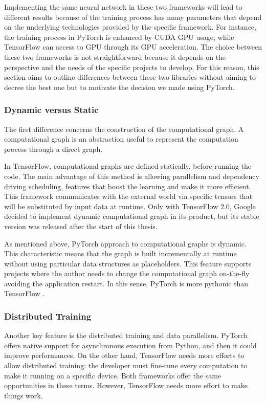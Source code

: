Implementing the same neural network in these two frameworks will lead to different results because of the training process has many parameters that depend on the underlying technologies provided by the specific framework.
For instance, the training process in PyTorch is enhanced by CUDA GPU usage, while TensorFlow can access to GPU through its GPU acceleration.
The choice between these two frameworks is not straightforward because it depends on the perspective and the needs of the specific projects to develop.
For this reason, this section aims to outline differences between these two libraries without aiming to decree the best one but to motivate the decision we made using PyTorch.

\subsubsection{Dynamic versus Static}

The first difference concerns the construction of the computational graph.
A computational graph is an abstraction useful to represent the computation process through a direct graph.

In TensorFlow, computational graphs are defined statically, before running the code.
The main advantage of this method is allowing parallelism and dependency driving scheduling, features that boost the learning and make it more efficient.
This framework communicates with the external world via specific tensors that will be substituted by input data at runtime.
Only with TensorFlow 2.0, Google decided to implement dynamic computational graph in its product, but its stable version was released after the start of this thesis.

As mentioned above, PyTorch approach to computational graphs is dynamic.
This characteristic means that the graph is built incrementally at runtime without using particular data structures as placeholders.
This feature supports projects where the author needs to change the computational graph on-the-fly avoiding the application restart.
In this sense, PyTorch is more pythonic than TensorFlow \cite{builtin2019pytorch}.

\subsubsection{Distributed Training}

Another key feature is the distributed training and data parallelism.
PyTorch offers native support for asynchronous execution from Python, and then it could improve performances.
On the other hand, TensorFlow needs more efforts to allow distributed training: the developer must fine-tune every computation to make it running on a specific device.
Both frameworks offer the same opportunities in these terms.
However, TensorFlow needs more effort to make things work.

